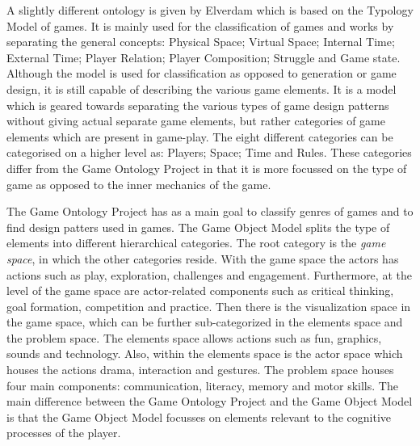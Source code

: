 \documentclass[11pt]{article}
\begin{document}
A slightly different ontology is given by Elverdam \cite{Elverdam2007} which is based on the Typology Model of games. It is mainly used for the classification of games and works by separating the general concepts: Physical Space; Virtual Space; Internal Time; External Time; Player Relation; Player Composition; Struggle and Game state. Although the model is used for classification as opposed to generation or game design, it is still capable of describing the various game elements. It is a model which is geared towards separating the various types of game design patterns without giving actual separate game elements, but rather categories of game elements which are present in game-play. The eight different categories can be categorised on a higher level as: Players; Space; Time and Rules. These categories differ from the Game Ontology Project in that it is more focussed on the type of game as opposed to the inner mechanics of the game.

The Game Ontology Project has as a main goal to classify genres of games and to find design patters used in games. The Game Object Model \cite{Amory2006} splits the type of elements into different hierarchical categories. The root category is the \emph{game space}, in which the other categories reside. With the game space the actors has actions such as play, exploration, challenges and engagement. Furthermore, at the level of the game space are actor-related components such as critical thinking, goal formation, competition and practice. Then there is the visualization space in the game space, which can be further sub-categorized in the elements space and the problem space. The elements space allows actions such as fun, graphics, sounds and technology. Also, within the elements space is the actor space which houses the actions drama, interaction and gestures. The problem space houses four main components: communication, literacy, memory and motor skills. The main difference between the Game Ontology Project 
and the Game Object Model is that the Game Object Model focusses on elements relevant to the cognitive processes of the player.
\end{document}
